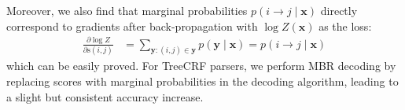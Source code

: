 Moreover, we also find that marginal probabilities $p(i \rightarrow j\mid\boldsymbol{x})$ directly correspond to gradients after back-propagation with $\log Z(\boldsymbol{x})$ as the loss:
\begin{equation}
    \label{equation:partial-derivative}
    \begin{split}
        \frac{\partial \log Z}{\partial \mathrm{s}(i, j)} %
        &= \sum_{\boldsymbol{y}:(i,j) \in \boldsymbol{{y}}} p(\boldsymbol{y}\mid\boldsymbol{x}) = p(i \rightarrow j\mid\boldsymbol{x})
    \end{split}
\end{equation}
which can be easily proved. %
For TreeCRF parsers, we perform MBR decoding \cite{smith-smith-2007-probabilistic} by replacing scores with marginal probabilities in the decoding algorithm,
leading to a slight but consistent accuracy increase.


